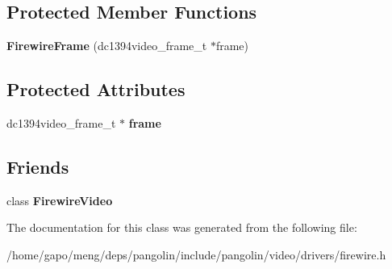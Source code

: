 \subsection*{Protected Member Functions}
\begin{DoxyCompactItemize}
\item 
{\bfseries Firewire\+Frame} (dc1394video\+\_\+frame\+\_\+t $\ast$frame)\hypertarget{classpangolin_1_1_firewire_frame_a573813da2acb7a4a63b32443b43bb699}{}\label{classpangolin_1_1_firewire_frame_a573813da2acb7a4a63b32443b43bb699}

\end{DoxyCompactItemize}
\subsection*{Protected Attributes}
\begin{DoxyCompactItemize}
\item 
dc1394video\+\_\+frame\+\_\+t $\ast$ {\bfseries frame}\hypertarget{classpangolin_1_1_firewire_frame_a1bf30640728f47796cbbc67d80da5c81}{}\label{classpangolin_1_1_firewire_frame_a1bf30640728f47796cbbc67d80da5c81}

\end{DoxyCompactItemize}
\subsection*{Friends}
\begin{DoxyCompactItemize}
\item 
class {\bfseries Firewire\+Video}\hypertarget{classpangolin_1_1_firewire_frame_ada29d5b2de43663f9ed5d56b7578afb3}{}\label{classpangolin_1_1_firewire_frame_ada29d5b2de43663f9ed5d56b7578afb3}

\end{DoxyCompactItemize}


The documentation for this class was generated from the following file\+:\begin{DoxyCompactItemize}
\item 
/home/gapo/meng/deps/pangolin/include/pangolin/video/drivers/firewire.\+h\end{DoxyCompactItemize}
